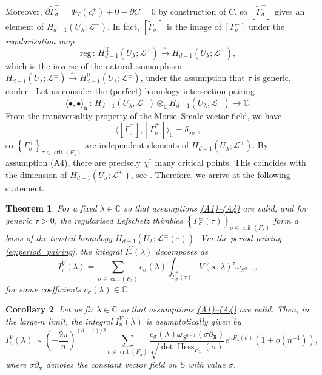 \documentclass[11pt, a4paper]{article}
\newtheorem{theorem}{Theorem}
\numberwithin{theorem}{section}
\newtheorem{corollary}[theorem]{Corollary}
\theoremstyle{remark}
\newcommand{\CC}{\mathbb{C}}
\DeclareMathOperator{\crit}{crit}
\DeclareMathOperator{\Hess}{Hess}
\renewcommand{\L}{\mathcal{L}}
\newcommand{\bb}[1]{\boldsymbol{#1}}
\newcommand{\lf}{\mathrm{lf}}
\newcommand{\Sc}{\mathbb{S}}
\theoremstyle{theorem}
\begin{document}
Moreover, $\partial \widetilde{\Gamma}^-_\sigma = \Phi_T(c_\epsilon^+) + 0 - \partial C = 0$ by construction of $C$, so $[\widetilde{\Gamma}^-_\sigma]$ gives an element of $H_{d-1}(U_\lambda;\L^-)$. In fact, $[\widetilde{\Gamma}^-_\sigma]$ is the image of $[\Gamma^-_\sigma]$ under the \emph{regularisation map}
\[
  \mathrm{reg} \,:\, H^{\lf}_{d-1}(U_\lambda;\L^\pm) \xrightarrow{\sim} H_{d-1}(U_\lambda;\L^\pm),
\]
which is the inverse of the natural isomorphism $H_{d-1}(U_\lambda;\L^\pm) \xrightarrow{\sim} H^{\lf}_{d-1}(U_\lambda;\L^\pm)$, under the assumption that $\tau$ is generic, confer \cite[\S 3.2.5]{aomoto2011theory}. Let us consider the (perfect) homology intersection pairing 
\[
  \langle \bullet,\bullet \rangle_{\mathrm{h}} \,:\, H_{d-1}(U_\lambda, \L^-) \otimes_{\CC} H_{d-1}(U_\lambda, \L^+) \rightarrow \CC.
\]
From the transversality property of the Morse--Smale vector field, we have
\[
  \langle [\widetilde{\Gamma}^-_\sigma], [\widetilde{\Gamma}^+_{\sigma'}]\rangle_{\mathrm{h}} = \delta_{\sigma{\sigma'}},
\]
so $\left\{ \Gamma^\pm_\sigma \right\}_{\sigma \in \crit(F_\lambda)}$ are independent elements of $H_{d-1}(U_\lambda;\L^\pm)$. By assumption \hyperref[ass:A4]{(A4)}, there are precisely $\chi^*$ many critical points. This coincides with the dimension of $H_{d-1}(U_\lambda;\L^\pm)$, see \cite[Theorem A.1]{agostini2022vector}. Therefore, we arrive at the following statement.
\begin{theorem}
  \label{thm:lefschetz_decomp}
  For a fixed $\lambda\in\CC$ so that assumptions \hyperref[ass:A1]{(A1)--(A4)} are valid, and for generic $\tau>0$, the regularised Lefschetz thimbles $\left\{ \Gamma^\pm_\sigma(\tau) \right\}_{\sigma \in \crit(F_\lambda)}$ form a basis of the twisted homology $H_{d-1}(U_\lambda;\L^\pm(\tau))$. Via the period pairing \eqref{eq:period_pairing}, the integral $I_\tau^V(\lambda)$ decomposes as 
  \begin{equation}
    \label{eq:thm_Lefschetz_decomp}
    I_\tau^V(\lambda) = \sum_{\sigma\in\crit(F_\lambda)} c_\sigma(\lambda) \int_{\widetilde{\Gamma}^+_\sigma(\tau)} V(\bb{x},\lambda)^\tau \omega_{S^{d-1}},
  \end{equation}
  for some coefficients $c_\sigma(\lambda) \in \CC$.
\end{theorem}

\begin{corollary}
  \label{cor:stationary_phase}
  Let us fix $\lambda\in\CC$ so that assumptions \hyperref[ass:A1]{(A1)--(A4)} are valid. Then, in the large-$n$ limit, the integral $I_n^V(\lambda)$ is asymptotically given by
  \begin{equation}
    \label{eq:asymptotic_thimble_expansion}
    I_n^V(\lambda) \sim \left( -\frac{2\pi}{n} \right)^{(d-1)/2} \sum_{\sigma\in\crit(F_\lambda)} \frac{c_\sigma(\lambda)\omega_{S^{d-1}}(\sigma\partial_{\bb{x}})}{\sqrt{\det \Hess_{F_\lambda}(\sigma)}} e^{n F_\lambda(\sigma)} (1+ o(n^{-1})),
  \end{equation}
  where $\sigma\partial_{\bb{x}}$ denotes the constant vector field on $\Sc$ with value $\sigma$.
\end{corollary}
\end{document}
